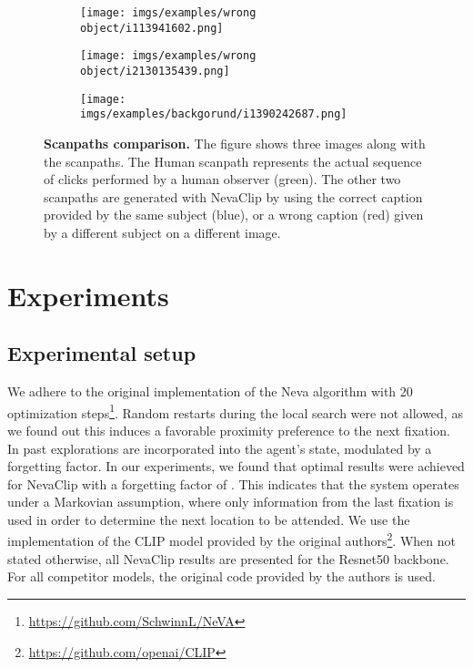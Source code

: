 \documentclass{article}
\begin{document}
\begin{figure}[t]

  \centering
  
  \begin{subfigure}[t]{0.33\textwidth}
  \texttt{[image: imgs/examples/wrong object/i113941602.png]}
  \end{subfigure}\hfill
  \begin{subfigure}[t]{0.33\textwidth}
  \texttt{[image: imgs/examples/wrong object/i2130135439.png]}
  \end{subfigure}\hfill
  \begin{subfigure}[t]{0.33\textwidth}
  \texttt{[image: imgs/examples/backgorund/i1390242687.png]}
  \end{subfigure}
  \caption{\textbf{Scanpaths comparison. }The figure shows three images along with the scanpaths. The Human scanpath represents the actual sequence of clicks performed by a human observer (green). The other two scanpaths are generated with NevaClip by using the correct caption provided by the same subject (blue), or a wrong caption (red) given by a different subject on a different image.
}
  \label{fig:scanpaths_examples}
\end{figure}



\section{Experiments}

\subsection{Experimental setup}
We adhere to the original implementation of the Neva algorithm with 20 optimization steps\footnote{\url{https://github.com/SchwinnL/NeVA}}. Random restarts during the local search were not allowed, as we found out this induces a favorable proximity preference \citep{koch1987shifts} to the next fixation.  In \citep{schwinn2022behind} past explorations are incorporated into the agent's state, modulated by  a forgetting factor. In our experiments, we found that optimal results were achieved for NevaClip with a forgetting factor of . This indicates that the system operates under a Markovian assumption, where only information from the last fixation is used in order to determine the next location to be attended. We use the implementation of the CLIP model provided by the original authors\footnote{\url{https://github.com/openai/CLIP}}. When not stated otherwise, all NevaClip results are presented for the Resnet50 backbone.  For all  competitor models, the original code provided by the authors is used. 
\end{document}
